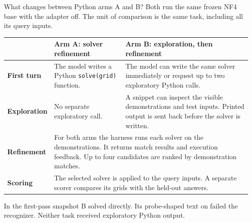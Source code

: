 \begin{frame}[t]{What changes between Python arms A and B?}
\med
Both run the same frozen NF4 base with the adapter off. The unit of comparison is the same task, including all its query inputs.
\par\vspace{4mm}
\smallbody\begin{tabular}{@{}>{\bfseries}p{27mm}p{85mm}p{91mm}@{}}
\toprule
 & Arm A: solver refinement & Arm B: exploration, then refinement\\
\midrule
First turn & The model writes a Python \texttt{solve(grid)} function. & The model can write the same solver immediately or request up to two exploratory Python calls.\\[2mm]
Exploration & No separate exploratory call. & A snippet can inspect the visible demonstrations and test inputs. Printed output is sent back before the solver is written.\\[2mm]
Refinement & \multicolumn{2}{p{175mm}}{For both arms the harness runs each solver on the demonstrations. It returns match results and execution feedback. Up to four candidates are ranked by demonstration matches.}\\[2mm]
Scoring & \multicolumn{2}{p{175mm}}{The selected solver is applied to the query inputs. A separate scorer compares its grids with the held-out answers.}\\
\bottomrule\end{tabular}
\vfill\smallbody In the first-pass snapshot B solved  directly. Its probe-shaped text on  failed the recognizer. Neither task received exploratory Python output.
\end{frame}
